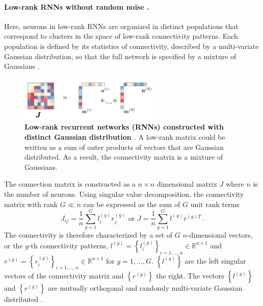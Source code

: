\documentclass[11pt]{article}
\begin{document}
	\paragraph{Low-rank RNNs without random noise \cite{beiran2021shaping, dubreuil2022role}.}
	Here, neurons in low-rank RNNs are organized in distinct populations that correspond to clusters in the space of low-rank connectivity patterns. Each population is defined by its statistics of connectivity, described by a multi-variate Gaussian distribution, so that the full network is specified by a mixture of Gaussians \cite{beiran2021shaping}.
		\begin{figure}[H]
			\centering
			\includegraphics[width=0.6\textwidth]{../figures/low_rank_RNN_without_noise.jpg}
			\caption{\textbf{Low-rank recurrent networks (RNNs) constructed with distinct Gaussian distribution \cite{beiran2023parametric}}. A low-rank matrix could be written as a sum of outer products of vectors that are Gaussian distributed. As a result, the connectivity matrix is a mixture of Gaussians. }
			\label{fig:low_rank_RNN_without_noise}
		\end{figure}
	The connection matrix is constructed as a $n \times n$ dimensional matrix $J$ where $n$ is the number of neurons. Using singular value decomposition, the connectivity matrix with rank $G \ll n$ can be expressed as the sum of $G$ unit rank terms
		\begin{equation} \label{eq:low_rank_RNN_without_noise}
			J_{ij} = \frac{1}{n}\sum_{g = 1}^{G} l_i^{(g)}r_j^{(g)} \, \, \text{or} \, \, J = \frac{1}{n} \sum_{g=1}^{G} l^{(g)} r^{(g)T} \, . 
		\end{equation}
	The connectivity is therefore characterized by a set of $G$ $n$-dimensional vectors, or the $g$-th connectivity patterns, $l^{(g)} = \left\{l_i^{(g)}\right\}_{i = 1, ..., n } \in \mathbb{R}^{n \times 1}$ and $r^{(g)} = \left\{r_i^{(g)}\right\}_{i = 1, ..., n } \in \mathbb{R}^{n \times 1}$ for $g = 1, ..., G$. $\left\{l^{(g)}\right\}$ are the left singular vectors of the connectivity matrix and $\left\{r^{(g)}\right\}$ the right. The vectors $\left\{l^{(g)}\right\}$ and $\left\{r^{(g)}\right\}$ are mutually orthogonal and randomly multi-variate Gaussian distributed \cite{beiran2021shaping}. 
	
\end{document}
